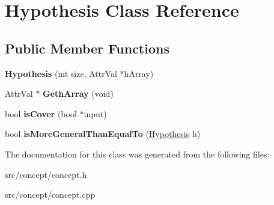 \hypertarget{classHypothesis}{\section{Hypothesis Class Reference}
\label{classHypothesis}
}
\subsection*{Public Member Functions}
\begin{DoxyCompactItemize}
\item 
\hypertarget{classHypothesis_a3bca791c3dcc2aa2f0d1e8dc16fa2cf3}{{\bfseries Hypothesis} (int size, Attr\-Val $\ast$h\-Array)}\label{classHypothesis_a3bca791c3dcc2aa2f0d1e8dc16fa2cf3}

\item 
\hypertarget{classHypothesis_a9f7689475f40bcd554b01ad7670aec8a}{Attr\-Val $\ast$ {\bfseries Geth\-Array} (void)}\label{classHypothesis_a9f7689475f40bcd554b01ad7670aec8a}

\item 
\hypertarget{classHypothesis_a65026e3096cc134fb15e54c482b7bd7a}{bool {\bfseries is\-Cover} (bool $\ast$input)}\label{classHypothesis_a65026e3096cc134fb15e54c482b7bd7a}

\item 
\hypertarget{classHypothesis_ab8d9d311060a302fe11457b067898e24}{bool {\bfseries is\-More\-General\-Than\-Equal\-To} (\hyperlink{classHypothesis}{Hypothesis} h)}\label{classHypothesis_ab8d9d311060a302fe11457b067898e24}

\end{DoxyCompactItemize}


The documentation for this class was generated from the following files\-:\begin{DoxyCompactItemize}
\item 
src/concept/concept.\-h\item 
src/concept/concept.\-cpp\end{DoxyCompactItemize}
